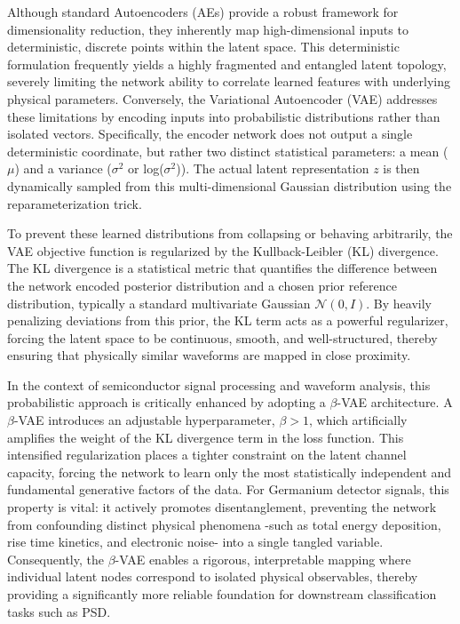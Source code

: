 Although standard Autoencoders (AEs) provide a robust framework for dimensionality reduction, they inherently map high-dimensional inputs to deterministic, discrete points within the latent space. This deterministic formulation frequently yields a highly fragmented and entangled latent topology, severely limiting the network ability to correlate learned features with underlying physical parameters. Conversely, the Variational Autoencoder (VAE) addresses these limitations by encoding inputs into probabilistic distributions rather than isolated vectors. Specifically, the encoder network does not output a single deterministic coordinate, but rather two distinct statistical parameters: a mean ($\mu$) and a variance ($\sigma^2$ or log($\sigma^2$)). The actual latent representation $z$ is then dynamically sampled from this multi-dimensional Gaussian distribution using the reparameterization trick. 

To prevent these learned distributions from collapsing or behaving arbitrarily, the VAE objective function is regularized by the Kullback-Leibler (KL) divergence. The KL divergence is a statistical metric that quantifies the difference between the network encoded posterior distribution and a chosen prior reference distribution, typically a standard multivariate Gaussian $\mathcal{N}(0, I)$. By heavily penalizing deviations from this prior, the KL term acts as a powerful regularizer, forcing the latent space to be continuous, smooth, and well-structured, thereby ensuring that physically similar waveforms are mapped in close proximity.

In the context of semiconductor signal processing and waveform analysis, this probabilistic approach is critically enhanced by adopting a $\beta$-VAE architecture. A $\beta$-VAE introduces an adjustable hyperparameter, $\beta > 1$, which artificially amplifies the weight of the KL divergence term in the loss function. This intensified regularization places a tighter constraint on the latent channel capacity, forcing the network to learn only the most statistically independent and fundamental generative factors of the data. For Germanium detector signals, this property is vital: it actively promotes disentanglement, preventing the network from confounding distinct physical phenomena -such as total energy deposition, rise time kinetics, and electronic noise- into a single tangled variable. Consequently, the $\beta$-VAE enables a rigorous, interpretable mapping where individual latent nodes correspond to isolated physical observables, thereby providing a significantly more reliable foundation for downstream classification tasks such as \ac{PSD}.

